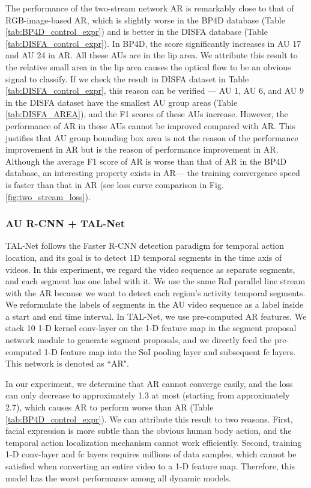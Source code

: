 \documentclass[5p,twocolumn]{elsarticle}
\begin{document}
The performance of the two-stream network AR is remarkably close to that of RGB-image-based AR, which is slightly worse in the BP4D database (Table \ref{tab:BP4D_control_expr}) and is better in the DISFA database (Table \ref{tab:DISFA_control_expr}). In BP4D, the score significantly increases in AU 17 and AU 24 in AR. All these AUs are in the lip area. We attribute this result to the relative small area in the lip area causes the optical flow to be an obvious signal to classify. If we check the result in DISFA dataset in Table \ref{tab:DISFA_control_expr}, this reason can be verified --- AU 1, AU 6, and AU 9 in the DISFA dataset have the smallest AU group areas (Table \ref{tab:DISFA_AREA}), and the F1 scores of these AUs increase. However, the performance of AR in these AUs cannot be improved compared with AR. This justifies that AU group bounding box area is not the reason of the performance improvement in AR but is the reason of performance improvement in AR.
Although the average F1 score of AR is worse than that of AR in the BP4D database, an interesting property exists in AR--- the training convergence speed is faster than that in AR (see loss curve comparison in Fig. \ref{fig:two_stream_loss}).  



\subsubsection{AU R-CNN + TAL-Net}


TAL-Net \cite{chao2018rethinking} follows the Faster R-CNN detection paradigm for temporal action location, and its goal is to detect 1D temporal segments in the time axis of videos. In this experiment, we regard the video sequence as separate segments, and each segment has one label with it.
We use the same RoI parallel line stream with the AR because we want to detect each region's activity temporal segments. We reformulate the labels of segments in the AU video sequence as a label inside a start and end time interval. In TAL-Net, we use pre-computed AR features. We stack 10 1-D  kernel conv-layer on the 1-D feature map in the segment proposal network module to generate segment proposals, and we directly feed the pre-computed 1-D feature map into the SoI pooling layer and subsequent fc layers. This network is denoted as ``AR".

In our experiment, we determine that AR cannot converge easily, and the loss can only decrease to approximately 1.3 at most (starting from approximately 2.7), which causes AR to perform worse than AR (Table \ref{tab:BP4D_control_expr}). We can attribute this result to two reasons. First, facial expression is more subtle than the obvious human body action, and the temporal action localization mechanism cannot work efficiently. Second, training 1-D conv-layer and fc layers requires millions of data samples, which cannot be satisfied when converting an entire video to a 1-D feature map. Therefore, this model has the worst performance among all dynamic models.
\end{document}
